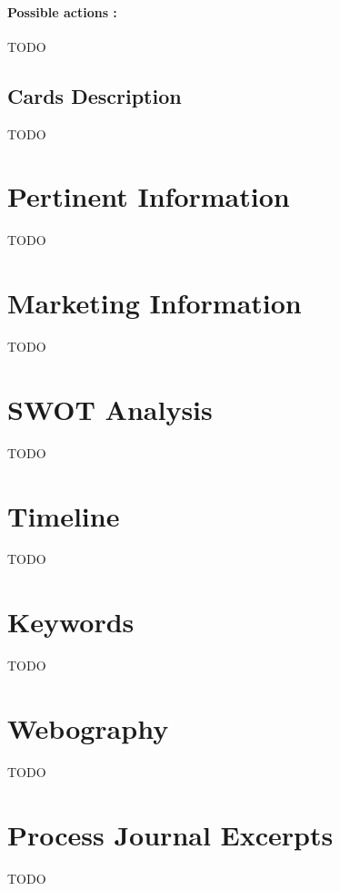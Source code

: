 \documentclass[12pt]{article}
\begin{document}
            \paragraph{Possible actions :\\}
                TODO
        \subsection{Cards Description}
            TODO
    
    \section{Pertinent Information}
        TODO
    
    \section{Marketing Information}
        TODO
    
    \section{SWOT Analysis}
        TODO
    
    \section{Timeline}
        TODO
    
    \section{Keywords}
        TODO
    
    \section{Webography}
        TODO
        
    \section{Process Journal Excerpts}
        TODO
    
\end{document}
